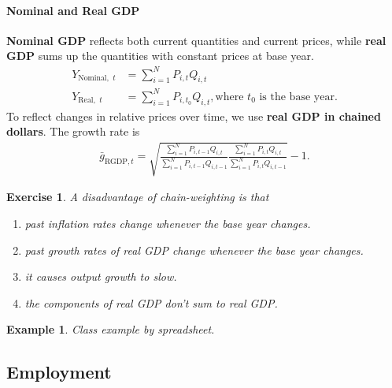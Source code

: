\documentclass[12pt]{article}
\newtheorem{example}{Example}
\newtheorem{exercise}{Exercise}
\numberwithin{equation}{section}
\begin{document}
\vspace{36pt}

\paragraph{Nominal and Real GDP}
\textbf{Nominal GDP} reflects both current quantities and current prices, while \textbf{real GDP} sums up the quantities with constant prices at base year. 
\begin{align*}
    Y_{\text{Nominal, }\, t} &= \sum^N_{i=1} P_{i,t}Q_{i,t}\\
    Y_{\text{Real, }\, t} &= \sum^N_{i=1} P_{i,t_0}Q_{i,t}, \text{where } t_0 \text{ is the base year.}
\end{align*}
To reflect changes in relative prices over time, we use \textbf{real GDP in chained dollars}. The growth rate is
\begin{align*}
    \bar{g}_{\text{RGDP}, t} = \sqrt{\frac{\sum^N_{i=1} P_{i,t-1}Q_{i,t}}{\sum^N_{i=1} P_{i,t-1}Q_{i,t-1}} \frac{\sum^N_{i=1} P_{i,t}Q_{i,t}}{\sum^N_{i=1} P_{i,t}Q_{i,t-1}}}-1.
\end{align*}
\begin{exercise}
    A disadvantage of chain-weighting is that
    \begin{enumerate}[label=\Alph*.]
        \item past inflation rates change whenever the base year changes.
        \item past growth rates of real GDP change whenever the base year changes.
        \item it causes output growth to slow.
        \item the components of real GDP don't sum to real GDP.
    \end{enumerate}
\end{exercise}


\begin{example}
    Class example by spreadsheet.
\end{example}

\vspace{36pt}

\subsection*{Employment}
\end{document}
